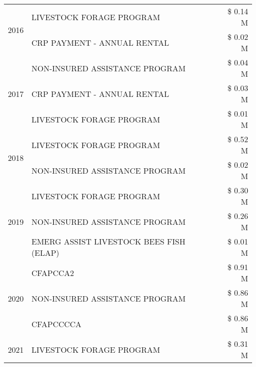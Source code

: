 \begin{tabular}{llr}
\cline{1-3}
\multirow[t]{2}{*}{2016} & LIVESTOCK FORAGE PROGRAM & \$ 0.14 M \\
 & CRP PAYMENT - ANNUAL RENTAL & \$ 0.02 M \\
\cline{1-3}
\multirow[t]{3}{*}{2017} & NON-INSURED ASSISTANCE PROGRAM & \$ 0.04 M \\
 & CRP PAYMENT - ANNUAL RENTAL & \$ 0.03 M \\
 & LIVESTOCK FORAGE PROGRAM & \$ 0.01 M \\
\cline{1-3}
\multirow[t]{2}{*}{2018} & LIVESTOCK FORAGE PROGRAM & \$ 0.52 M \\
 & NON-INSURED ASSISTANCE PROGRAM & \$ 0.02 M \\
\cline{1-3}
\multirow[t]{3}{*}{2019} & LIVESTOCK FORAGE PROGRAM & \$ 0.30 M \\
 & NON-INSURED ASSISTANCE PROGRAM & \$ 0.26 M \\
 & EMERG ASSIST LIVESTOCK BEES FISH (ELAP) & \$ 0.01 M \\
\cline{1-3}
\multirow[t]{3}{*}{2020} & CFAPCCA2 & \$ 0.91 M \\
 & NON-INSURED ASSISTANCE PROGRAM & \$ 0.86 M \\
 & CFAPCCCCA & \$ 0.86 M \\
\cline{1-3}
2021 & LIVESTOCK FORAGE PROGRAM & \$ 0.31 M \\
\cline{1-3}
\bottomrule
\end{tabular}
